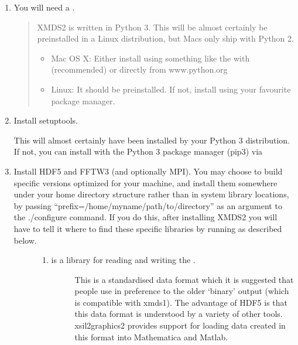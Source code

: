 \documentclass[letterpaper,10pt,english]{sphinxmanual}
\begin{document}
\begin{enumerate}
\item {} 
\sphinxAtStartPar
You will need a .
\begin{quote}

\sphinxAtStartPar
XMDS2 is written in Python 3. This will be almost certainly be preinstalled in a Linux distribution, but Macs only ship with Python 2.
\begin{itemize}
\item {} 
\sphinxAtStartPar
Mac OS X: Either install using something like the  with  (recommended) or directly from www.python.org

\item {} 
\sphinxAtStartPar
Linux: It should be pre\sphinxhyphen{}installed. If not, install using your favourite package manager.

\end{itemize}
\end{quote}

\item {} 
\sphinxAtStartPar
Install setuptools.

\sphinxAtStartPar
This will almost certainly have been installed by your Python 3 distribution. If not, you can install with the Python 3 package manager (pip3) via 

\item {} \begin{description}
\item[{Install HDF5 and FFTW3 (and optionally MPI). You may choose to build specific versions optimized for your machine, and install them somewhere under your home directory structure rather than in system library locations, by passing “\textendash{}prefix=/home/myname/path/to/directory” as an argument to the ./configure command. If you do this, after installing XMDS2 you will have to tell it where to find these specific libraries by running  as described below.}] \leavevmode{}\label{\detokenize{installation:hdf5-installation}}\begin{enumerate}
%
\item {} \begin{description}
\item[{ is a library for reading and writing the .}] \leavevmode
\sphinxAtStartPar
This is a standardised data format which it is suggested that people use in preference to the older ‘binary’ output (which is
compatible with xmds\sphinxhyphen{}1). The advantage of HDF5 is that this data format is understood by a variety of other tools. xsil2graphics2
provides support for loading data created in this format into Mathematica and Matlab.


\end{description}
\end{enumerate}
\end{description}
\end{enumerate}
\end{document}
